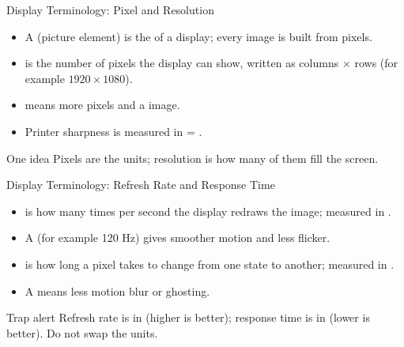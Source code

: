 \documentclass[aspectratio=169]{beamer}
\begin{document}
\begin{frame}{Display Terminology: Pixel and Resolution}
  \begin{itemize}
    \item A  (picture element) is the  of a display; every image is built from pixels.
    \item {} is the number of pixels the display can show,
      written as columns $\times$ rows (for example $1920 \times 1080$).
    \item {} means more pixels and a 
      image.
    \item Printer sharpness is measured in  =
      .
  \end{itemize}
  \begin{block}{One idea}
    Pixels are the units; resolution is how many of them fill the screen.
  \end{block}
\end{frame}

\begin{frame}{Display Terminology: Refresh Rate and Response Time}
  \begin{itemize}
    \item {} is how many times per second the display
      redraws the image; measured in .
    \item A  (for example 120 Hz) gives smoother
      motion and less flicker.
    \item {} is how long a pixel takes to change from one
      state to another; measured in .
    \item A  means less motion blur or ghosting.
  \end{itemize}
  \begin{alertblock}{Trap alert}
    Refresh rate is in  (higher is better); response time is in
     (lower is better). Do not swap the units.
  \end{alertblock}
\end{frame}
\end{document}
